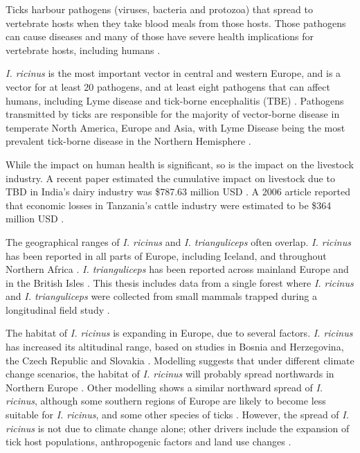\documentclass{article}
\begin{document}
Ticks harbour pathogens (viruses, bacteria and protozoa) that spread to vertebrate hosts when they take blood meals from those hosts. Those pathogens can cause diseases and many of those have severe health implications for vertebrate hosts, including humans \cite{Johnson2023e}.

\textit{I. ricinus} is the most important vector in central and western Europe, and is a vector for at least 20 pathogens, and at least eight pathogens that can affect humans, including Lyme disease and tick-borne encephalitis (TBE) \cite{Gray2024}. Pathogens transmitted by ticks are responsible for the majority of vector-borne disease in temperate North America, Europe and Asia, with Lyme Disease being the most prevalent tick-borne disease in the Northern Hemisphere \cite{Rochlin2020}. 

While the impact on human health is significant, so is the impact on the livestock industry. A recent paper estimated the cumulative impact on livestock due to TBD in India's dairy industry was \$787.63 million USD \cite{Singh2022}. A 2006 article reported that economic losses in Tanzania's cattle industry were estimated to be \$364 million USD \cite{Kivaria2006}.

The geographical ranges of \textit{I. ricinus} and \textit{I. trianguliceps} often overlap. \textit{I. ricinus} has been reported in all parts of Europe, including Iceland, and throughout Northern Africa \cite{Otranto_2017}. \textit{I. trianguliceps} has been reported across mainland Europe and in the British Isles \cite{Pf_ffle_2017}. This thesis includes data from a single forest where \textit{I. ricinus} and \textit{I. trianguliceps} were collected from small mammals trapped during a longitudinal field study \cite{Bown2008, Bown2011}.

The habitat of \textit{I. ricinus} is expanding in Europe, due to several factors. \textit{I. ricinus} has increased its altitudinal range, based on studies in Bosnia and Herzegovina, the Czech Republic and Slovakia \cite{Medlock2013}. Modelling suggests that under different climate change scenarios, the habitat of \textit{I. ricinus} will probably spread northwards in Northern Europe \cite{Alkishe_2017}. Other modelling shows a similar northward spread of \textit{I. ricinus}, although some southern regions of Europe are likely to become less suitable for \textit{I. ricinus}, and some other species of ticks \cite{Cunze_2022}. However, the spread of \textit{I. ricinus} is not due to climate change alone; other drivers include the expansion of tick host populations, anthropogenic factors and land use changes \cite{Medlock2013}.
\end{document}
